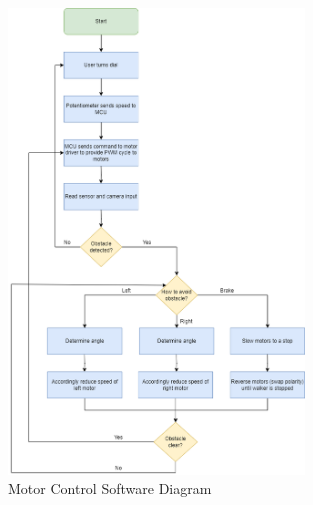 \begin{figure}[H]
	\centering
	\includegraphics[width=0.7\textwidth]{./Images/motorsw.drawio.png}
	\caption{\label{fig:motorsw}Motor Control Software Diagram}
\end{figure}


